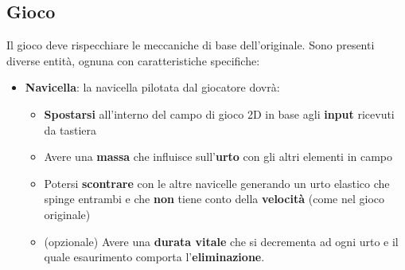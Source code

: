     \subsection{Gioco}
        Il gioco deve rispecchiare le meccaniche di base dell'originale. Sono presenti diverse entità, ognuna con caratteristiche specifiche:
            \begin{itemize}
                \item \textbf{Navicella}: la navicella pilotata dal giocatore dovrà:
                    \begin{itemize}
                        \item \textbf{Spostarsi} all'interno del campo di gioco 2D in base agli \textbf{input} ricevuti da tastiera
                        \item Avere una \textbf{massa} che influisce sull'\textbf{urto} con gli altri elementi in campo
                        \item Potersi \textbf{scontrare} con le altre navicelle generando un urto elastico che spinge entrambi e che \textbf{non} tiene conto della \textbf{velocità} (come nel gioco originale)
                        \item (opzionale) Avere una \textbf{durata vitale} che si decrementa ad ogni urto e il quale esaurimento comporta l'\textbf{eliminazione}.
                        

\end{itemize}
\end{itemize}
